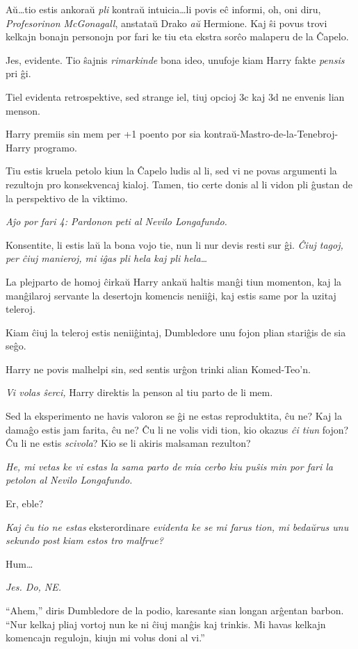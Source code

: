 Aŭ\ldots tio estis ankoraŭ \emph{pli} kontraŭ intuicia\ldots li povis
eĉ informi, oh, oni diru, \emph{Profesorinon McGonagall}, anstataŭ
Drako \emph{aŭ} Hermione. Kaj ŝi povus trovi kelkajn bonajn personojn por
fari ke tiu eta ekstra sorĉo malaperu de la Ĉapelo.

Jes, evidente. Tio ŝajnis \emph{rimarkinde} bona ideo, unufoje kiam
Harry fakte \emph{pensis} pri ĝi.

Tiel evidenta retrospektive, sed strange iel, tiuj opcioj 3c kaj 3d ne
envenis lian menson.

Harry premiis sin mem per +1 poento por sia
kontraŭ-Mastro-de-la-Tenebroj-Harry programo.

Tiu estis kruela petolo kiun la Ĉapelo ludis al li, sed vi ne povas
argumenti la rezultojn pro konsekvencaj kialoj. Tamen, tio certe donis
al li vidon pli ĝustan de la perspektivo de la viktimo.

\emph{Aĵo por fari 4: Pardonon peti al Nevilo Longafundo.}

Konsentite, li estis laŭ la bona vojo tie, nun li nur devis resti sur
ĝi. \emph{Ĉiuj tagoj, per ĉiuj manieroj, mi iĝas pli hela kaj pli
  hela\ldots}

La plejparto de homoj ĉirkaŭ Harry ankaŭ haltis manĝi tiun momenton,
kaj la manĝilaroj servante la desertojn komencis neniiĝi, kaj estis
same por la uzitaj teleroj.

Kiam ĉiuj la teleroj estis neniiĝintaj, Dumbledore unu fojon plian
stariĝis de sia seĝo.

Harry ne povis malhelpi sin, sed sentis urĝon trinki alian
Komed-Teo'n.

\emph{Vi \emph{volas} ŝerci,} Harry direktis la penson al tiu parto de li mem.

Sed la eksperimento ne havis valoron se ĝi ne estas reproduktita, ĉu
ne?  Kaj la damaĝo estis jam farita, ĉu ne? Ĉu li ne volis vidi tion,
kio okazus \emph{ĉi tiun} fojon? Ĉu li ne estis \emph{scivola}? Kio se
li akiris malsaman rezulton?

\emph{He, mi vetas ke vi estas la sama parto de mia cerbo kiu puŝis
  min por fari la petolon al Nevilo Longafundo.}

Er, eble?

\emph{Kaj ĉu tio ne estas} eksterordinare \emph{evidenta ke se mi
  farus tion, mi bedaŭrus unu sekundo post kiam estos tro malfrue?}

Hum\ldots

\emph{Jes. Do, NE.}

``Ahem,'' diris Dumbledore de la podio, karesante sian longan arĝentan
barbon. ``Nur kelkaj pliaj vortoj nun ke ni ĉiuj manĝis kaj
trinkis. Mi havas kelkajn komencajn regulojn, kiujn mi volus doni al
vi.''

